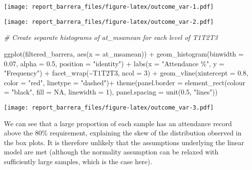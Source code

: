 \documentclass[
]{article}
\newenvironment{Shaded}{\begin{snugshade}}{\end{snugshade}}
\newcommand{\AttributeTok}[1]{\textcolor[rgb]{0.77,0.63,0.00}{#1}}
\newcommand{\CommentTok}[1]{\textcolor[rgb]{0.56,0.35,0.01}{\textit{#1}}}
\newcommand{\ConstantTok}[1]{\textcolor[rgb]{0.00,0.00,0.00}{#1}}
\newcommand{\DecValTok}[1]{\textcolor[rgb]{0.00,0.00,0.81}{#1}}
\newcommand{\FloatTok}[1]{\textcolor[rgb]{0.00,0.00,0.81}{#1}}
\newcommand{\FunctionTok}[1]{\textcolor[rgb]{0.00,0.00,0.00}{#1}}
\newcommand{\NormalTok}[1]{#1}
\newcommand{\SpecialCharTok}[1]{\textcolor[rgb]{0.00,0.00,0.00}{#1}}
\newcommand{\StringTok}[1]{\textcolor[rgb]{0.31,0.60,0.02}{#1}}
\begin{document}
\texttt{[image: report\_barrera\_files/figure-latex/outcome\_var-1.pdf]}

\begin{Shaded}
\end{Shaded}

\texttt{[image: report\_barrera\_files/figure-latex/outcome\_var-2.pdf]}

\begin{Shaded}
\begin{Highlighting}[]
\CommentTok{\# Create separate histograms of at\_msamean for each level of T1T2T3}

\FunctionTok{ggplot}\NormalTok{(filtered\_barrera, }\FunctionTok{aes}\NormalTok{(}\AttributeTok{x =}\NormalTok{ at\_msamean)) }\SpecialCharTok{+}
  \FunctionTok{geom\_histogram}\NormalTok{(}\AttributeTok{binwidth =} \FloatTok{0.07}\NormalTok{, }\AttributeTok{alpha =} \FloatTok{0.5}\NormalTok{, }\AttributeTok{position =} \StringTok{"identity"}\NormalTok{) }\SpecialCharTok{+}
  \FunctionTok{labs}\NormalTok{(}\AttributeTok{x =} \StringTok{"Attendance \%"}\NormalTok{, }\AttributeTok{y =} \StringTok{"Frequency"}\NormalTok{) }\SpecialCharTok{+}
  \FunctionTok{facet\_wrap}\NormalTok{(}\SpecialCharTok{\textasciitilde{}}\NormalTok{T1T2T3, }\AttributeTok{ncol =} \DecValTok{3}\NormalTok{) }\SpecialCharTok{+}
  \FunctionTok{geom\_vline}\NormalTok{(}\AttributeTok{xintercept =} \FloatTok{0.8}\NormalTok{, }\AttributeTok{color =} \StringTok{"red"}\NormalTok{, }\AttributeTok{linetype =} \StringTok{"dashed"}\NormalTok{)}\SpecialCharTok{+}
  \FunctionTok{theme}\NormalTok{(}\AttributeTok{panel.border =} \FunctionTok{element\_rect}\NormalTok{(}\AttributeTok{colour =} \StringTok{"black"}\NormalTok{, }\AttributeTok{fill =} \ConstantTok{NA}\NormalTok{, }\AttributeTok{linewidth =} \DecValTok{1}\NormalTok{),}
        \AttributeTok{panel.spacing =} \FunctionTok{unit}\NormalTok{(}\FloatTok{0.5}\NormalTok{, }\StringTok{"lines"}\NormalTok{))}
\end{Highlighting}
\end{Shaded}

\texttt{[image: report\_barrera\_files/figure-latex/outcome\_var-3.pdf]}

We can see that a large proportion of each sample has an attendance
record above the 80\% requirement, explaining the skew of the
distribution observed in the box plots. It is therefore unlikely that
the assumptions underlying the linear model are met (although the
normality assumption can be relaxed with sufficiently large samples,
which is the case here).
\end{document}
